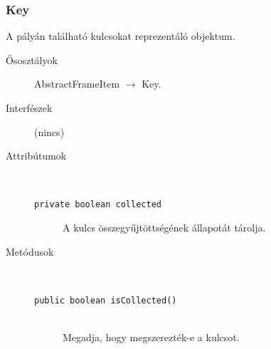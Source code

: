 		\subsubsection{Key}
				 A pályán található kulcsokat reprezentáló objektum. 			\begin{description}


				\item[Ősosztályok] AbstractFrameItem $\rightarrow{}$ Key.
				\item[Interfészek] (nincs)
				\item[Attribútumok]$\ $
					\begin{description}
						\item[\texttt{private boolean collected}] A kulcs összegyűjtöttségének állapotát tárolja. 
					\end{description}
				\item[Metódusok]$\ $
					\begin{description}
						\item[\texttt{public boolean isCollected()}] \hfill \\ Megadja, hogy megszerezték-e a kulcsot. 
					\end{description}
			\end{description}

